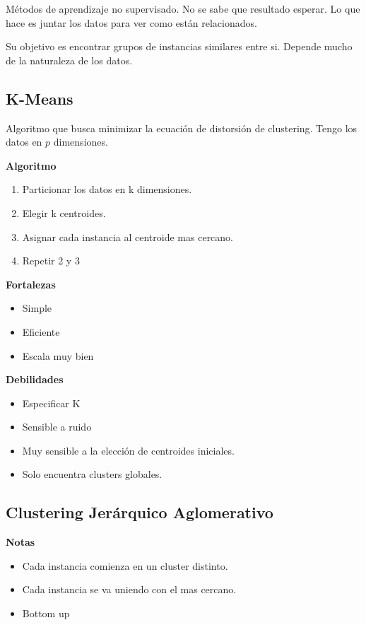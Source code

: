 \documentclass[titlepage,a4paper]{article}
\begin{document}
Métodos de aprendizaje no supervisado. No se sabe que resultado esperar. Lo que hace es juntar los datos para ver como están relacionados.

Su objetivo es encontrar grupos de instancias similares entre si. Depende mucho de la naturaleza de los datos.


\subsection{K-Means}
Algoritmo que busca minimizar la ecuación de distorsión de clustering. Tengo los datos en $p$ dimensiones.

\textbf{Algoritmo}
\begin{enumerate}
    \item Particionar los datos en k dimensiones. %
    \item Elegir k centroides.
    \item Asignar cada instancia al centroide mas cercano.
    \item Repetir 2 y 3
\end{enumerate}


\textbf{Fortalezas}
\begin{itemize}
    \item Simple
    \item Eficiente
    \item Escala muy bien
\end{itemize}

\textbf{Debilidades}
\begin{itemize}
    \item Especificar K
    \item Sensible a ruido
    \item Muy sensible a la elección de centroides iniciales.
    \item Solo encuentra clusters globales.
\end{itemize}


\subsection{Clustering Jerárquico Aglomerativo}
\textbf{Notas}
\begin{itemize}
    \item Cada instancia comienza en un cluster distinto.
    \item Cada instancia se va uniendo con el mas cercano.
    \item Bottom up
\end{itemize}
\end{document}
